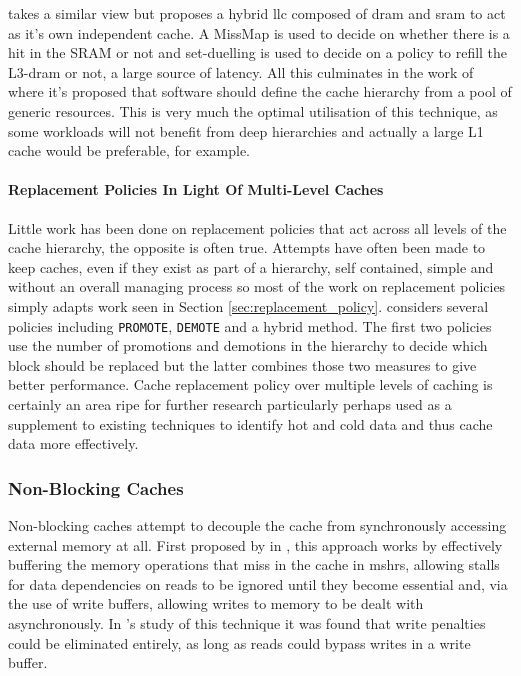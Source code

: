 \citet{hameedAdaptiveCacheManagement2013, hameedReducingLatencySRAM2014} takes a similar view but proposes a hybrid \gls{llc} composed of \gls{dram} and \gls{sram} to act as it's own independent cache. A MissMap \cite{lohEfficientlyEnablingConventional2011} is used to decide on whether there is a hit in the SRAM or not and set-duelling is used to decide on a policy to refill the L3-\gls{dram} or not, a large source of latency. All this culminates in the work of \citet{tsaiJengaSoftwaredefinedCache2017} where it's proposed that software should define the cache hierarchy from a pool of generic resources. This is very much the optimal utilisation of this technique, as some workloads will not benefit from deep hierarchies and actually a large L1 cache would be preferable, for example. 

\paragraph{Replacement Policies In Light Of Multi-Level Caches}

Little work has been done on replacement policies that act across all levels of the cache hierarchy, the opposite is often true. Attempts have often been made to keep caches, even if they exist as part of a hierarchy, self contained, simple and without an overall managing process so most of the work on replacement policies simply adapts work seen in Section \ref{sec:replacement_policy}. \citet{kelwadeReputationBasedCache2017} considers several policies including \texttt{PROMOTE}, \texttt{DEMOTE} and a hybrid method. The first two policies use the number of promotions and demotions in the hierarchy to decide which block should be replaced but the latter combines those two measures to give better performance. Cache replacement policy over multiple levels of caching is certainly an area ripe for further research particularly perhaps used as a supplement to existing techniques to identify hot and cold data and thus cache data more effectively.

\subsubsection{Non-Blocking Caches}

\label{sec:non-blocking}

Non-blocking caches attempt to decouple the cache from synchronously accessing external memory at all. First proposed by \citet{kroftLockupfreeInstructionFetch1981} in \citeyear{kroftLockupfreeInstructionFetch1981}, this approach works by effectively buffering the memory operations that miss in the cache in \gls{mshr}s, allowing stalls for data dependencies on reads to be ignored until they become essential and, via the use of write buffers, allowing writes to memory to be dealt with asynchronously. In \citet{chenReducingMemoryLatency1992}'s study of this technique it was found that write penalties could be eliminated entirely, as long as reads could bypass writes in a write buffer. 

